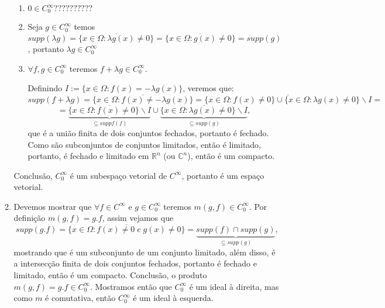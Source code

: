 \documentclass{article}
\begin{document}
\begin{enumerate}
\begin{enumerate}
			\begin{enumerate}
				\item $0 \in C^{\infty}_{0} ??????????$
				
				\item Seja $g \in C^{\infty}_{0}$ temos $supp(\lambda g) = \overline{\{x \in \Omega: \lambda g(x) \neq 0\}} = \overline{\{x \in \Omega: g(x) \neq 0\}} = supp(g)$, portanto $\lambda g \in C^{\infty}_{0}$
				
				\item 
				$\forall f, g \in C^{\infty}_{0}$ teremos $f + \lambda g \in C^{\infty}_{0}$.
				
				Definindo $I := \{x \in \Omega: f(x) = - \lambda g(x)\}$, veremos que:
				$$
				supp(f + \lambda g ) =\overline{\{x \in \Omega: f(x) \neq -\lambda g(x)\} }= \overline{\{x \in \Omega: f(x) \neq 0 \} \cup \{x \in \Omega: \lambda g(x) \neq 0\}\backslash I } = 
				$$
				$$
				= \underbrace{\overline{\{x \in \Omega: f(x) \neq 0 \}\backslash I}}_{\subseteq suppf(f)} \cup \underbrace{\overline{\{x \in \Omega: \lambda g(x) \neq 0\}\backslash I }}_{\subseteq supp(g)},
				$$
				que é a união finita de dois conjuntos fechados, portanto é fechado. Como são subconjuntos de conjuntos limitados, então é limitado, portanto, é fechado e limitado em $\mathbb{R}^{n}$ (ou $\mathbb{C}^{n}$), então é um compacto.
			\end{enumerate}
			Conclusão, $C^{\infty}_{0}$ é um subespaço vetorial de $C^{\infty}$, portanto é um espaço vetorial.
			
			\item Devemos mostrar que $\forall f \in C^{\infty}$ e $g \in C^{\infty}_{0}$ teremos $m(g,f) \in C^{\infty}_{0}$. Por definição $m(g, f) = g.f$, assim vejamos que 
			$$
			supp(g.f) = \overline{ \{x \in \Omega: f(x) \neq 0 \; e \; g(x) \neq 0 \} } = \underbrace{supp(f) \cap supp(g)}_{\subseteq supp(g)},
			$$
			mostrando que é um subconjunto de um conjunto limitado, além disso, é a intersecção finita de dois conjuntos fechados, portanto é fechado e limitado, então é um compacto. Conclusão, o produto $m(g, f) = g.f \in C^{\infty}_{0}$. Mostramos então que $C^{\infty}_{0}$ é um ideal à direita, mas como $m$ é comutativa, então $C^{\infty}_{0}$ é um ideal à esquerda.
		\end{enumerate}
	\end{enumerate}
		
\end{document}
